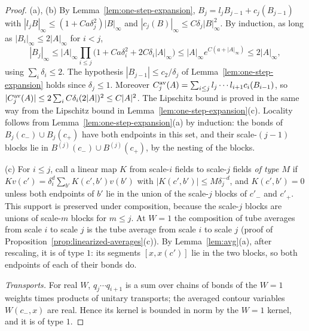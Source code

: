 \begin{proof}
(a), (b) By Lemma~\ref{lem:one-step-expansion}, $B_j=l_jB_{j-1}+c_j(B_{j-1})$ with $|l_jB|_\infty\le(1+Ca\delta_j^2)|B|_\infty$ and $|c_j(B)|_\infty\le C\delta_j|B|_\infty^2$. By induction, as long as $|B_{i}|_\infty\le2|A|_\infty$ for $i<j$,
\[
|B_j|_\infty\le|A|_\infty\prod_{i\le j}\big(1+Ca\delta_i^2+2C\delta_i|A|_\infty\big)\le|A|_\infty e^{C(a+|A|_\infty)}\le2|A|_\infty,
\]
using $\sum_i\delta_i\le2$. The hypothesis $|B_{j-1}|\le c_2/\delta_j$ of Lemma~\ref{lem:one-step-expansion} holds since $\delta_j\le1$. Moreover $C^{\rm av}_j(A)=\sum_{i\le j}l_j\cdots l_{i+1}c_i(B_{i-1})$, so $|C^{\rm av}_j(A)|\le2\sum_iC\delta_i(2|A|)^2\le C|A|^2$. The Lipschitz bound is proved in the same way from the Lipschitz bound in Lemma~\ref{lem:one-step-expansion}(c). Locality follows from Lemma~\ref{lem:one-step-expansion}(a) by induction: the bonds of $B_j(c_-)\cup B_j(c_+)$ have both endpoints in this set, and their scale-$(j-1)$ blocks lie in $B^{(j)}(c_-)\cup B^{(j)}(c_+)$, by the nesting of the blocks.

(c) For $i\le j$, call a linear map $K$ from scale-$i$ fields to scale-$j$ fields \emph{of type $M$} if $Kv(c')=\delta_i^d\sum_{b'}K(c',b')v(b')$ with $|K(c',b')|\le M\delta_j^{-d}$, and $K(c',b')=0$ unless both endpoints of $b'$ lie in the union of the scale-$j$ blocks of $c'_-$ and $c'_+$. This support is preserved under composition, because the scale-$j$ blocks are unions of scale-$m$ blocks for $m\le j$. At $W=1$ the composition of tube averages from scale $i$ to scale $j$ is the tube average from scale $i$ to scale $j$ (proof of Proposition~\ref{prop:linearized-averages}(c)). By Lemma~\ref{lem:avg}(a), after rescaling, it is of type $1$: its segments $[x,x(c')]$ lie in the two blocks, so both endpoints of each of their bonds do.

\emph{Transports.} For real $W$, $q_j\cdots q_{i+1}$ is a sum over chains of bonds of the $W=1$ weights times products of unitary transports; the averaged contour variables $W(c_-,x)$ are real. Hence its kernel is bounded in norm by the $W=1$ kernel, and it is of type $1$.


\end{proof}
